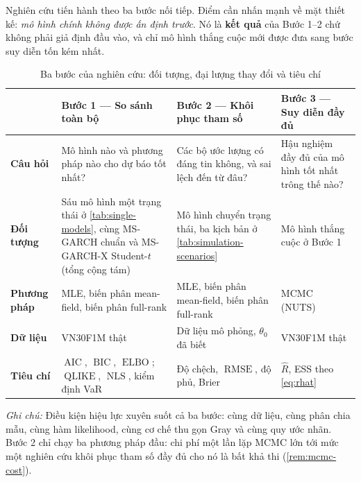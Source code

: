 \documentclass[12pt,a4paper]{article}
\numberwithin{equation}{section}
\theoremstyle{definition}
\newcommand{\ELBO}{\operatorname{ELBO}}
\newcommand{\AIC}{\operatorname{AIC}}
\newcommand{\BIC}{\operatorname{BIC}}
\newcommand{\RMSE}{\operatorname{RMSE}}
\newcommand{\QLIKE}{\operatorname{QLIKE}}
\newcommand{\NLS}{\operatorname{NLS}}
\begin{document}
	Nghiên cứu tiến hành theo ba bước nối tiếp. Điểm cần nhấn mạnh về mặt thiết kế:
	\emph{mô hình chính không được ấn định trước}. Nó là \textbf{kết quả} của Bước 1--2 chứ
	không phải giả định đầu vào, và chỉ mô hình thắng cuộc mới được đưa sang bước suy diễn
	tốn kém nhất.

	\begin{table}[H]
		\centering\footnotesize
		\setlength{\tabcolsep}{4pt}
		\caption{Ba bước của nghiên cứu: đối tượng, đại lượng thay đổi và tiêu chí}
		\label{tab:design}
		\begin{tabularx}{\textwidth}{>{\raggedright\arraybackslash\bfseries}p{1.9cm} Y Y Y}
			\toprule
			& \textbf{Bước 1 --- So sánh toàn bộ} & \textbf{Bước 2 --- Khôi phục tham số} & \textbf{Bước 3 --- Suy diễn đầy đủ} \\
			\midrule
			Câu hỏi & Mô hình nào và phương pháp nào cho dự báo tốt nhất? & Các bộ ước lượng có đáng tin không, và sai lệch đến từ đâu? & Hậu nghiệm đầy đủ của mô hình tốt nhất trông thế nào? \\
			\addlinespace[0.2em]
			Đối tượng & Sáu mô hình một trạng thái ở \cref{tab:single-models}, cùng MS-GARCH chuẩn và MS-GARCH-X Student-$t$ (tổng cộng tám) & Mô hình chuyển trạng thái, ba kịch bản ở \cref{tab:simulation-scenarios} & Mô hình thắng cuộc ở Bước 1 \\
			\addlinespace[0.2em]
			Phương pháp & MLE, biến phân mean-field, biến phân full-rank & MLE, biến phân mean-field, biến phân full-rank & MCMC (NUTS) \\
			\addlinespace[0.2em]
			Dữ liệu & VN30F1M thật & Dữ liệu mô phỏng, $\theta_0$ đã biết & VN30F1M thật \\
			\addlinespace[0.2em]
			Tiêu chí & $\AIC$, $\BIC$, $\ELBO$; $\QLIKE$, $\NLS$, kiểm định VaR & Độ chệch, $\RMSE$, độ phủ, Brier & $\widehat R$, ESS theo \eqref{eq:rhat} \\
			\bottomrule
		\end{tabularx}
		\vspace{0.3em}
		\raggedright\scriptsize
		\emph{Ghi chú:} Điều kiện hiệu lực xuyên suốt cả ba bước: cùng dữ liệu, cùng phân chia
		mẫu, cùng hàm likelihood, cùng cơ chế thu gọn Gray và cùng quy ước nhãn. Bước 2 chỉ chạy
		ba phương pháp đầu: chi phí một lần lặp MCMC lớn tới mức một nghiên cứu khôi phục tham
		số đầy đủ cho nó là bất khả thi (\cref{rem:mcmc-cost}).
	\end{table}
\end{document}

